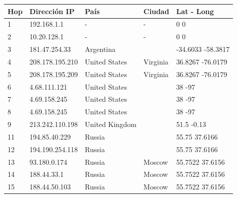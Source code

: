 \begin{center}
 \begin{tabular}{|l|l|l|l|l|}
    \hline
    Hop &Dirección IP &País &Ciudad &Lat - Long \\ \hline \hline
	1 & 192.168.1.1 & - & - & 0 0 \\ \hline
	2 & 10.20.128.1 & - & - & 0 0 \\ \hline
	3 & 181.47.254.33 & Argentina &  & -34.6033 -58.3817 \\ \hline
	4 & 208.178.195.210 & United States & Virginia & 36.8267 -76.0179 \\ \hline
	5 & 208.178.195.209 & United States & Virginia & 36.8267 -76.0179 \\ \hline
	6 & 4.68.111.121 & United States &  & 38 -97 \\ \hline
	7 & 4.69.158.245 & United States &  & 38 -97 \\ \hline
	8 & 4.69.158.245 & United States &  & 38 -97 \\ \hline
	9 & 213.242.110.198 & United Kingdom &  & 51.5 -0.13 \\ \hline
	11 & 194.85.40.229 & Russia &  & 55.75 37.6166 \\ \hline
	12 & 194.190.254.118 & Russia &  & 55.75 37.6166 \\ \hline
	13 & 93.180.0.174 & Russia & Moscow & 55.7522 37.6156 \\ \hline
	14 & 188.44.33.1 & Russia & Moscow & 55.7522 37.6156 \\ \hline
	15 & 188.44.50.103 & Russia & Moscow & 55.7522 37.6156 \\ \hline
 \end{tabular}
\end{center}


